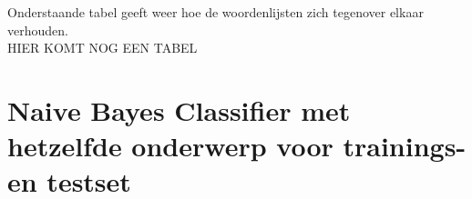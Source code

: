 Onderstaande tabel geeft weer hoe de woordenlijsten zich tegenover elkaar verhouden.\\
HIER KOMT NOG EEN TABEL\\


\section{Naive Bayes Classifier met hetzelfde onderwerp voor trainings- en testset}\label{Naive Bayes Classifier met hetzelfde onderwerp voor trainings- en testset}


